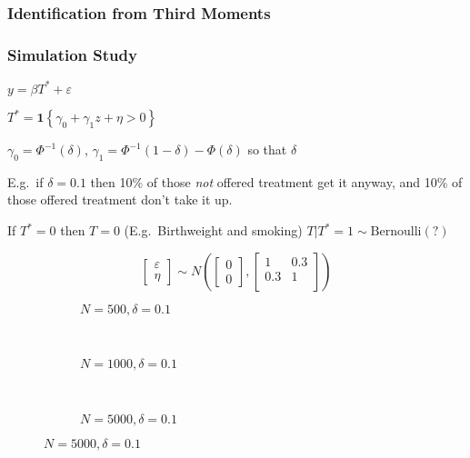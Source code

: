 \documentclass{beamer}
\begin{document}
\begin{frame}
  \frametitle{Identification from Third Moments}
\end{frame}
\begin{frame}
  \frametitle{Simulation Study}
  $y = \beta T^* + \varepsilon$

  $T^* = \mathbf{1}\left\{ \gamma_0 + \gamma_1 z + \eta > 0 \right\}$

  $\gamma_0 = \Phi^{-1}(\delta)$, $\gamma_1 = \Phi^{-1}(1-\delta) - \Phi(\delta)$ so that $\delta$

  E.g.\ if $\delta=0.1$ then 10\% of those \emph{not} offered treatment get it anyway, and 10\% of those offered treatment don't take it up.
  
  If $T^*=0$ then $T=0$ (E.g.\ Birthweight and smoking)
  $T|T^*=1 \sim \mbox{Bernoulli}(?)$

  \[ \left[
  \begin{array}{c}
  \varepsilon \\ \eta
\end{array}
\right] \sim N\left( \left[
\begin{array}{c}
0 \\ 0
\end{array}
\right], \left[
\begin{array}{cc}
1 & 0.3\\
0.3 & 1 \\
\end{array}
\right]\right)\]
\end{frame}
\begin{frame}
  \begin{center}
    {}
  \end{center}
\end{frame}
\begin{frame}
\begin{figure}[h]
  \scriptsize
  \begingroup
  \centering
  \begin{subfigure}[b]{0.31\textwidth}
\caption{\footnotesize $N=500, \delta = 0.1$}
  
  \end{subfigure}
  ~
  \begin{subfigure}[b]{0.31\textwidth}
    \caption{\footnotesize $N=1000, \delta = 0.1$} 
  
  \end{subfigure}
  ~
  \begin{subfigure}[b]{0.31\textwidth}
\caption{\footnotesize $N=5000, \delta = 0.1$}
  
  \end{subfigure}
\endgroup
\end{figure}
\end{frame}
\end{document}
